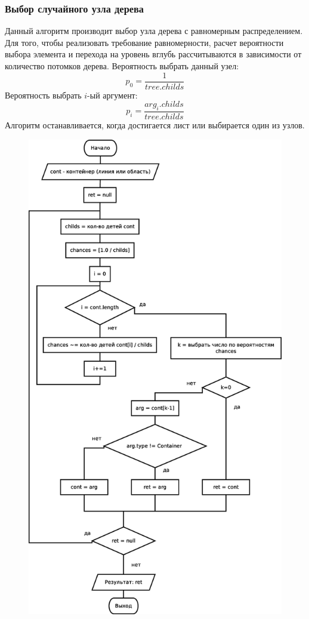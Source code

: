 \documentclass[russian,utf8,emptystyle]{eskdtext}
\begin{document}
\begin{spacing}{1.5}
\subsubsection{Выбор случайного узла дерева}
Данный алгоритм производит выбор узла дерева с равномерным распределением. Для того, чтобы реализовать требование равномерности, расчет вероятности выбора элемента и перехода на уровень вглубь рассчитываются в зависимости от количество потомков дерева.
Вероятность выбрать данный узел:
$$
p_0 = \frac{1}{tree.childs}
$$
Вероятность выбрать $i$-ый аргумент:
$$
p_i = \frac{arg_i.childs}{tree.childs}
$$
Алгоритм останавливается, когда достигается лист или выбирается один из узлов.

\clearpage
\begin{figure}[h!]
\centering
\includegraphics[height=0.9\textheight]{get_random_element_alg.eps}
\end{figure}


\end{spacing}
\end{document}
